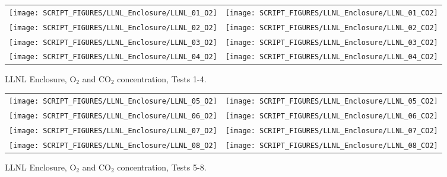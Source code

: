 \newpage

\begin{figure}[p]
\begin{tabular*}{\textwidth}{l@{\extracolsep{\fill}}r}
\texttt{[image: SCRIPT\_FIGURES/LLNL\_Enclosure/LLNL\_01\_O2]} &
\texttt{[image: SCRIPT\_FIGURES/LLNL\_Enclosure/LLNL\_01\_CO2]} \\
\texttt{[image: SCRIPT\_FIGURES/LLNL\_Enclosure/LLNL\_02\_O2]} &
\texttt{[image: SCRIPT\_FIGURES/LLNL\_Enclosure/LLNL\_02\_CO2]} \\
\texttt{[image: SCRIPT\_FIGURES/LLNL\_Enclosure/LLNL\_03\_O2]} &
\texttt{[image: SCRIPT\_FIGURES/LLNL\_Enclosure/LLNL\_03\_CO2]} \\
\texttt{[image: SCRIPT\_FIGURES/LLNL\_Enclosure/LLNL\_04\_O2]} &
\texttt{[image: SCRIPT\_FIGURES/LLNL\_Enclosure/LLNL\_04\_CO2]}
\end{tabular*}
\caption[LLNL Enclosure, O$_2$ and CO$_2$ concentration, Tests 1-4]{LLNL Enclosure, O$_2$ and CO$_2$ concentration, Tests 1-4.}
\label{LLNL_Gas_1}
\end{figure}

\begin{figure}[p]
\begin{tabular*}{\textwidth}{l@{\extracolsep{\fill}}r}
\texttt{[image: SCRIPT\_FIGURES/LLNL\_Enclosure/LLNL\_05\_O2]} &
\texttt{[image: SCRIPT\_FIGURES/LLNL\_Enclosure/LLNL\_05\_CO2]} \\
\texttt{[image: SCRIPT\_FIGURES/LLNL\_Enclosure/LLNL\_06\_O2]} &
\texttt{[image: SCRIPT\_FIGURES/LLNL\_Enclosure/LLNL\_06\_CO2]} \\
\texttt{[image: SCRIPT\_FIGURES/LLNL\_Enclosure/LLNL\_07\_O2]} &
\texttt{[image: SCRIPT\_FIGURES/LLNL\_Enclosure/LLNL\_07\_CO2]} \\
\texttt{[image: SCRIPT\_FIGURES/LLNL\_Enclosure/LLNL\_08\_O2]} &
\texttt{[image: SCRIPT\_FIGURES/LLNL\_Enclosure/LLNL\_08\_CO2]}
\end{tabular*}
\caption[LLNL Enclosure, O$_2$ and CO$_2$ concentration, Tests 5-8]{LLNL Enclosure, O$_2$ and CO$_2$ concentration, Tests 5-8.}
\label{LLNL_Gas_2}
\end{figure}

